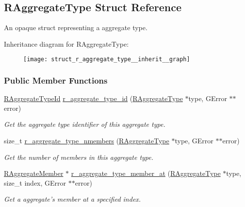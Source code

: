\hypertarget{struct_r_aggregate_type}{\subsection{R\-Aggregate\-Type Struct Reference}
\label{struct_r_aggregate_type}
}


An opaque struct representing a aggregate type.  




Inheritance diagram for R\-Aggregate\-Type\-:\nopagebreak
\begin{figure}[H]
\begin{center}
\leavevmode
\texttt{[image: struct\_r\_aggregate\_type\_\_inherit\_\_graph]}
\end{center}
\end{figure}
\subsubsection*{Public Member Functions}
\begin{DoxyCompactItemize}
\item 
\hyperlink{aggregate__type_8h_ae208e3e28b5dcedb640f7f4b0581d61a}{R\-Aggregate\-Type\-Id} \hyperlink{struct_r_aggregate_type_a3ad647b94dd87268b91e92f630b84726}{r\-\_\-aggregate\-\_\-type\-\_\-id} (\hyperlink{struct_r_aggregate_type}{R\-Aggregate\-Type} $\ast$type, G\-Error $\ast$$\ast$error)
\begin{DoxyCompactList}\small\item\em Get the aggregate type identifier of this aggregate type. \end{DoxyCompactList}\item 
size\-\_\-t \hyperlink{struct_r_aggregate_type_a193960ea5996d7c1c7935b1525cf64c9}{r\-\_\-aggregate\-\_\-type\-\_\-nmembers} (\hyperlink{struct_r_aggregate_type}{R\-Aggregate\-Type} $\ast$type, G\-Error $\ast$$\ast$error)
\begin{DoxyCompactList}\small\item\em Get the number of members in this aggregate type. \end{DoxyCompactList}\item 
\hyperlink{struct_r_aggregate_member}{R\-Aggregate\-Member} $\ast$ \hyperlink{struct_r_aggregate_type_aea94153a211184cee889e445a7dd003a}{r\-\_\-aggregate\-\_\-type\-\_\-member\-\_\-at} (\hyperlink{struct_r_aggregate_type}{R\-Aggregate\-Type} $\ast$type, size\-\_\-t index, G\-Error $\ast$$\ast$error)
\begin{DoxyCompactList}\small\item\em Get a aggregate's member at a specified index. \end{DoxyCompactList}\end{DoxyCompactItemize}


